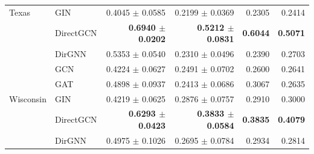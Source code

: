 \documentclass[utf8]{article}
\begin{document}
\begin{longtable}{llrrrr}
		Texas     & GIN       & 0.4045 $\pm$ 0.0585          & 0.2199 $\pm$ 0.0369          & 0.2305          & 0.2414          \\
		& DirectGCN & \textbf{0.6940 $\pm$ 0.0202} & \textbf{0.5212 $\pm$ 0.0831} & \textbf{0.6044} & \textbf{0.5071} \\
		& DirGNN    & 0.5353 $\pm$ 0.0540          & 0.2310 $\pm$ 0.0496          & 0.2390          & 0.2703          \\
		\midrule
		& GCN       & 0.4224 $\pm$ 0.0627          & 0.2491 $\pm$ 0.0702          & 0.2600          & 0.2641          \\
		& GAT       & 0.4898 $\pm$ 0.0937          & 0.2413 $\pm$ 0.0686          & 0.3067          & 0.2635          \\
		Wisconsin & GIN       & 0.4219 $\pm$ 0.0625          & 0.2876 $\pm$ 0.0757          & 0.2910          & 0.3000          \\
		& DirectGCN & \textbf{0.6293 $\pm$ 0.0423} & \textbf{0.3833 $\pm$ 0.0584} & \textbf{0.3835} & \textbf{0.4079} \\
		& DirGNN    & 0.4975 $\pm$ 0.1026          & 0.2695 $\pm$ 0.0784          & 0.2934          & 0.2814          \\
	\end{longtable}
	
\end{document}
